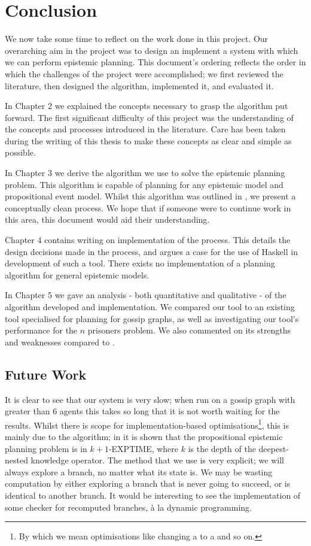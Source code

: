 \documentclass[10pt, a4paper]{report}
\begin{document}
\newpage

\chapter{Conclusion}

We now take some time to reflect on the work done in this project. Our
overarching aim in the project was to design an implement a system with which we
can perform epistemic planning. This document's ordering reflects the order in
which the challenges of the project were accomplished; we first reviewed the
literature, then designed the algorithm, implemented it, and evaluated it. 

In Chapter 2 we explained the concepts necessary to grasp the algorithm put
forward. The first significant difficulty of this project was the understanding
of the concepts and processes introduced in the literature. Care has been taken
during the writing of this thesis to make these concepts as clear and simple as
possible. 

In Chapter 3 we derive the algorithm we use to solve the epistemic planning
problem. This algorithm is capable of planning for any epistemic model and
propositional event model. Whilst this algorithm was outlined in
\cite{AutomataTechniques}, we present a conceptually clean process. We hope that
if someone were to continue work in this area, this document would aid their
understanding.

Chapter 4 contains writing on implementation of the process. This details the
design decisions made in the process, and argues a case for the use of Haskell
in development of such a tool. There exists no implementation of a planning
algorithm for general epistemic models. 

In Chapter 5 we gave an analysis - both quantitative and qualitative - of the
algorithm developed and implementation. We compared our tool to an existing tool
specialised for planning for gossip graphs, as well as investigating our tool's
performance for the $n$ prisoners problem. We also commented on its strengths and
weaknesses compared to \cite{GithubGossip}.

\section{Future Work}

It is clear to see that our system is very slow; when run on a gossip graph with
greater than 6 agents this takes so long that it is not worth waiting for the
results. Whilst there is scope for implementation-based
optimisations\footnote{By which we mean optimisations like changing a 
  to a  and so on.}, this is mainly due to the algorithm; in
\cite{AutomataTechniques} it is shown that the propositional epistemic planning
problem is in \textsf{$k + 1$-EXPTIME}, where $k$ is the depth of the
deepest-nested knowledge operator. The method that we use is very explicit; we
will always explore a branch, no matter what its state is. We may be wasting
computation by either exploring a branch that is never going to succeed, or is
identical to another branch. It would be interesting to see the implementation
of some checker for recomputed branches, \`{a} la dynamic programming.
\end{document}
